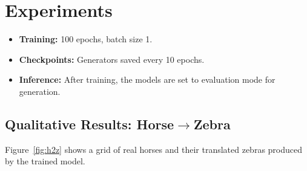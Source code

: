 \documentclass[11pt,a4paper]{article}
\begin{document}
\section{Experiments}
\begin{itemize}[leftmargin=1.25em]
    \item \textbf{Training:} 100 epochs, batch size 1.
    \item \textbf{Checkpoints:} Generators saved every 10 epochs.
    \item \textbf{Inference:} After training, the models are set to evaluation mode for generation.
\end{itemize}

\subsection{Qualitative Results: Horse$\rightarrow$Zebra}
Figure~\ref{fig:h2z} shows a grid of real horses and their translated zebras produced by the trained model.
\end{document}
